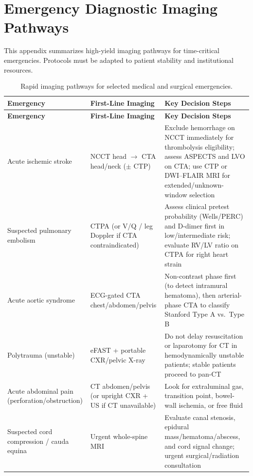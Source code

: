 \chapter{Emergency Diagnostic Imaging Pathways}
\label{app:imaging_algorithms}

This appendix summarizes high-yield imaging pathways for time-critical emergencies. Protocols must be adapted to patient stability and institutional resources.

\begin{longtable}{@{}p{}p{}p{}@{}}
\caption{Rapid imaging pathways for selected medical and surgical emergencies.}
\label{tab:app_emergency_pathways} \\
\toprule
\textbf{Emergency} & \textbf{First-Line Imaging} & \textbf{Key Decision Steps} \\
\midrule
\endfirsthead
\toprule
\textbf{Emergency} & \textbf{First-Line Imaging} & \textbf{Key Decision Steps} \\
\midrule
\endhead
Acute ischemic stroke & NCCT head $\rightarrow$ CTA head/neck ($\pm$ CTP) & Exclude hemorrhage on NCCT immediately for thrombolysis eligibility; assess ASPECTS and LVO on CTA; use CTP or DWI--FLAIR MRI for extended/unknown-window selection \\
Suspected pulmonary embolism & CTPA (or V/Q / leg Doppler if CTA contraindicated) & Assess clinical pretest probability (Wells/PERC) and D-dimer first in low/intermediate risk; evaluate RV/LV ratio on CTPA for right heart strain \\
Acute aortic syndrome & ECG-gated CTA chest/abdomen/pelvis & Non-contrast phase first (to detect intramural hematoma), then arterial-phase CTA to classify Stanford Type A vs.\ Type B \\
Polytrauma (unstable) & eFAST + portable CXR/pelvic X-ray & Do not delay resuscitation or laparotomy for CT in hemodynamically unstable patients; stable patients proceed to pan-CT \\
Acute abdominal pain (perforation/obstruction) & CT abdomen/pelvis (or upright CXR + US if CT unavailable) & Look for extraluminal gas, transition point, bowel-wall ischemia, or free fluid \\
Suspected cord compression / cauda equina & Urgent whole-spine MRI & Evaluate canal stenosis, epidural mass/hematoma/abscess, and cord signal change; urgent surgical/radiation consultation \\
\bottomrule
\end{longtable}
